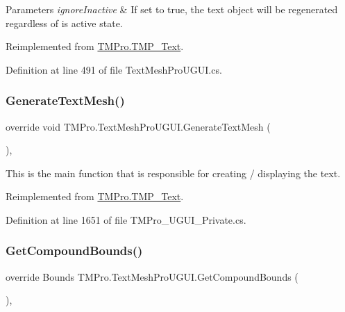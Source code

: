 \begin{DoxyParams}{Parameters}
{\em ignore\+Inactive} & If set to true, the text object will be regenerated regardless of is active state.\\
\hline
\end{DoxyParams}


Reimplemented from \mbox{\hyperlink{class_t_m_pro_1_1_t_m_p___text_a2cd34e05c191658295c67c373e608f5d}{T\+M\+Pro.\+T\+M\+P\+\_\+\+Text}}.



Definition at line 491 of file Text\+Mesh\+Pro\+U\+G\+U\+I.\+cs.

\mbox{\label{class_t_m_pro_1_1_text_mesh_pro_u_g_u_i_ae43d87969cffe98fbaea5edabc0d55dd}} 
\subsubsection{\texorpdfstring{GenerateTextMesh()}{GenerateTextMesh()}}
{\footnotesize\ttfamily override void T\+M\+Pro.\+Text\+Mesh\+Pro\+U\+G\+U\+I.\+Generate\+Text\+Mesh (\begin{DoxyParamCaption}{ }\end{DoxyParamCaption})\hspace{0.3cm}{\ttfamily [protected]}, {\ttfamily [virtual]}}



This is the main function that is responsible for creating / displaying the text. 



Reimplemented from \mbox{\hyperlink{class_t_m_pro_1_1_t_m_p___text_a537ab0215d185079796cc94a455d2cdc}{T\+M\+Pro.\+T\+M\+P\+\_\+\+Text}}.



Definition at line 1651 of file T\+M\+Pro\+\_\+\+U\+G\+U\+I\+\_\+\+Private.\+cs.

\mbox{\label{class_t_m_pro_1_1_text_mesh_pro_u_g_u_i_aec6bee5f25f07eaeeefaa5f6cd6ad35c}} 
\subsubsection{\texorpdfstring{GetCompoundBounds()}{GetCompoundBounds()}}
{\footnotesize\ttfamily override Bounds T\+M\+Pro.\+Text\+Mesh\+Pro\+U\+G\+U\+I.\+Get\+Compound\+Bounds (\begin{DoxyParamCaption}{ }\end{DoxyParamCaption})\hspace{0.3cm}{\ttfamily [protected]}, {\ttfamily [virtual]}}



